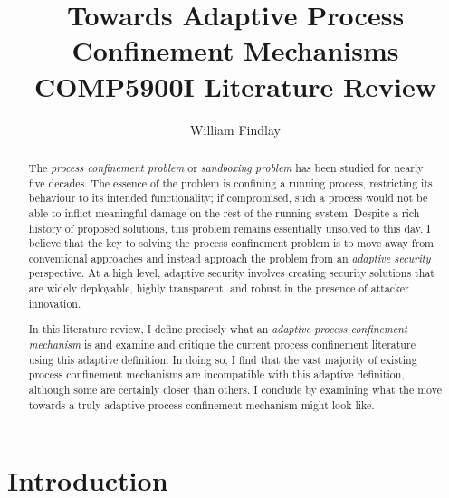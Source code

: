 \documentclass[dvipsnames, 12pt]{article}
\title{\huge Towards Adaptive Process Confinement
Mechanisms\\{\large COMP5900I Literature Review}}
\author{William Findlay}
\begin{document}
\maketitle
\thispagestyle{empty}


\vfill
\begin{abstract}
\noindent
The \textit{process confinement problem} or \textit{sandboxing problem} has been
studied for nearly five decades. The essence of the problem is confining
a running process, restricting its behaviour to its intended functionality; if
compromised, such a process would not be able to inflict meaningful damage on
the rest of the running system. Despite a rich history of proposed solutions,
this problem remains essentially unsolved to this day. I believe that the key to
solving the process confinement problem is to move away from conventional
approaches and instead approach the problem from an \textit{adaptive security}
perspective. At a high level, adaptive security involves creating security
solutions that are widely deployable, highly transparent, and robust in the
presence of attacker innovation.

In this literature review, I define precisely what an \textit{adaptive process
confinement mechanism} is and examine and critique the current process
confinement literature using this adaptive definition. In doing so, I find that
the vast majority of existing process confinement mechanisms are incompatible
with this adaptive definition, although some are certainly closer than others.
I conclude by examining what the move towards a truly adaptive process
confinement mechanism might look like.
\end{abstract}
\vfill
\vfill

\clearpage

\setcounter{page}{1}

\onehalfspacing

\section{Introduction}
\label{sec:introduction}
\end{document}
